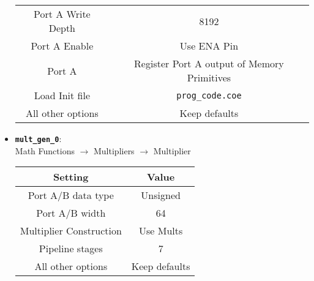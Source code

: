 \begin{itemize}
\begin{table}[H]
\begin{tabular}{cc}
			Port A Write Depth & 8192 \\
			Port A Enable & Use ENA Pin\\
			Port A & Register Port A output of Memory Primitives \\
			Load Init file & \texttt{prog_code.coe} \\
			All other options & Keep defaults \\
			\bottomrule
		\end{tabular}
	\end{table}
	\item \textbf{\texttt{mult_gen_0}}: \\ Math Functions $\to$ Multipliers $\to$ Multiplier
	\begin{table}[H]
		\centering
		\begin{tabular}{cc}
			\toprule
			\textbf{Setting} & \textbf{Value} \\
			\midrule
			Port A/B data type & Unsigned \\
			Port A/B width & 64 \\
			Multiplier Construction & Use Mults \\
			Pipeline stages & 7 \\
			All other options & Keep defaults \\
			\bottomrule
		\end{tabular}
	\end{table}
\end{itemize}
%
